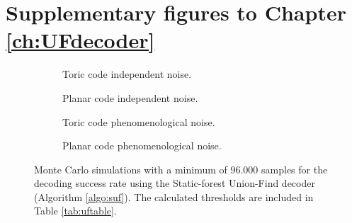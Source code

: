\section{Supplementary figures to Chapter \ref{ch:UFdecoder}}\label{ap:figuf}

\begin{figure}[htbp]
  \centering
  \begin{subfigure}[b]{0.49\textwidth}
      \begin{adjustbox}{Clip=0 1em 0 0}
        
      \end{adjustbox}
      \caption{Toric code independent noise.}
  \end{subfigure}
  \begin{subfigure}[b]{0.49\textwidth}
      \begin{adjustbox}{Clip=0 1em 0 0}
        
      \end{adjustbox}
      \caption{Planar code independent noise.}
  \end{subfigure}
  \begin{subfigure}[b]{0.49\textwidth}
      \begin{adjustbox}{Clip=0 1em 0 0}
        
      \end{adjustbox}
      \caption{Toric code phenomenological noise.}
  \end{subfigure}
  \begin{subfigure}[b]{0.49\textwidth}
      \begin{adjustbox}{Clip=0 1em 0 0}
        
      \end{adjustbox}
      \caption{Planar code phenomenological noise.}
  \end{subfigure}
  \caption{Monte Carlo simulations with a minimum of $96.000$ samples for the decoding success rate using the Static-forest Union-Find decoder (Algorithm \ref{algo:suf}). The calculated thresholds are included in Table \ref{tab:uftable}.}
  \label{fig:threshold_suf}
\end{figure}

